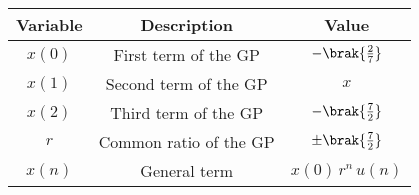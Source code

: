 \begin{tabular}[12.1pt]{ |c| c| c|}
    \hline
    \textbf{Variable} & \textbf{Description} &\textbf{Value}\\ 
    \hline
    $x(0)$ & First term of the GP &$-\brak{\frac{2}{7}}$ \\
    \hline 
    $x(1)$ & Second term of the GP &$x$ \\
    \hline 
    $x(2)$ & Third term of the GP &$-\brak{\frac{7}{2}}$ \\
    \hline 
    $r$ & Common ratio of the GP & $\pm \brak{\frac{7}{2}}$ \\
    \hline
    $x(n)$ & General term & $x(0)\,r^n\,u(n)$\\
    \hline    
\end{tabular}
